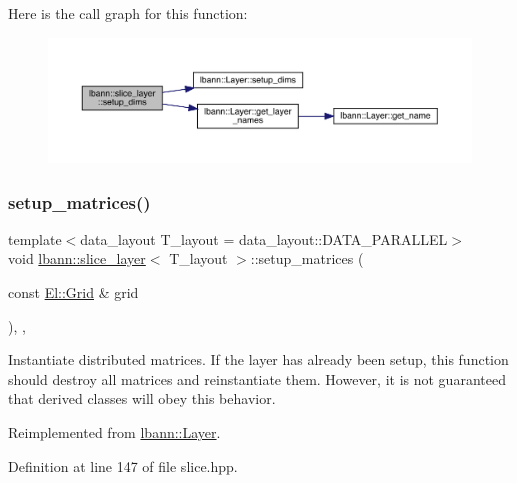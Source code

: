 Here is the call graph for this function\+:\nopagebreak
\begin{figure}[H]
\begin{center}
\leavevmode
\includegraphics[width=350pt]{classlbann_1_1slice__layer_ac43785fc01d6cf6e49d3677adfaac297_cgraph}
\end{center}
\end{figure}
\mbox{\label{classlbann_1_1slice__layer_af3b6f79a53c9a80908b37c2587ff2cae}} 
\subsubsection{\texorpdfstring{setup\+\_\+matrices()}{setup\_matrices()}}
{\footnotesize\ttfamily template$<$data\+\_\+layout T\+\_\+layout = data\+\_\+layout\+::\+D\+A\+T\+A\+\_\+\+P\+A\+R\+A\+L\+L\+EL$>$ \\
void \hyperlink{classlbann_1_1slice__layer}{lbann\+::slice\+\_\+layer}$<$ T\+\_\+layout $>$\+::setup\+\_\+matrices (\begin{DoxyParamCaption}\item[{const \hyperlink{base_8hpp_a9951bb1719d534e0401b1f06cad19eab}{El\+::\+Grid} \&}]{grid }\end{DoxyParamCaption})\hspace{0.3cm}{\ttfamily [inline]}, {\ttfamily [override]}, {\ttfamily [virtual]}}

Instantiate distributed matrices. If the layer has already been setup, this function should destroy all matrices and reinstantiate them. However, it is not guaranteed that derived classes will obey this behavior. 

Reimplemented from \hyperlink{classlbann_1_1Layer_a57bbe21131dc00ab5cf9ea5e3656808e}{lbann\+::\+Layer}.



Definition at line 147 of file slice.\+hpp.



